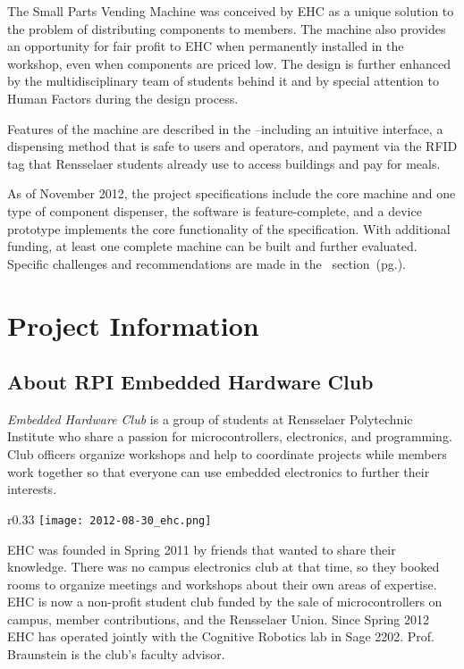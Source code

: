 \documentclass[12pt,oneside,final]{article}
\begin{document}
The Small Parts Vending Machine was conceived by EHC as a unique solution to the problem of distributing components to members. The machine also provides an opportunity for fair profit to EHC when permanently installed in the workshop, even when components are priced low. The design is further enhanced by the multidisciplinary team of students behind it and by special attention to Human Factors during the design process.

Features of the machine are described in the \emph{}--including an intuitive interface, a dispensing method that is safe to users and operators, and payment via the RFID tag that Rensselaer students already use to access buildings and pay for meals.

As of November 2012, the project specifications include the core machine and one type of component dispenser, the software is feature-complete, and a device prototype implements the core functionality of the specification. With additional funding, at least one complete machine can be built and further evaluated. Specific challenges and recommendations are made in the \emph{}~section~(pg.\pageref{sec:challenges}).


\pagebreak
\section{Project Information}
\label{sec:info}

\subsection{About RPI Embedded Hardware Club}
\emph{Embedded Hardware Club} is a group of students at Rensselaer Polytechnic Institute who share a passion for microcontrollers, electronics, and programming. Club officers organize workshops and help to coordinate projects while members work together so that everyone can use embedded electronics to further their interests.

\begin{wrapfigure}{r}{0.33\textwidth}%
  \centering%
  \texttt{[image: 2012-08-30\_ehc.png]}%
\end{wrapfigure}

EHC was founded in Spring 2011 by friends that wanted to share their knowledge. There was no campus electronics club at that time, so they booked rooms to organize meetings and workshops about their own areas of expertise. EHC is now a non-profit student club funded by the sale of microcontrollers on campus, member contributions, and the Rensselaer Union. Since Spring 2012 EHC has operated jointly with the Cognitive Robotics lab in Sage 2202. Prof. Braunstein is the club's faculty advisor.
\end{document}
